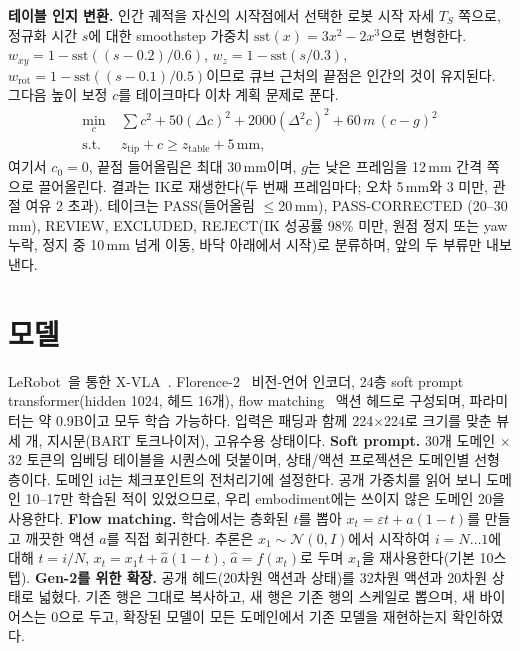 \documentclass[conference,10pt]{IEEEtran}
\newcommand{\mm}{\,mm\xspace}
\begin{document}
\textbf{테이블 인지 변환.} 인간 궤적을 자신의 시작점에서 선택한 로봇 시작 자세 $T_S$ 쪽으로, 정규화 시간 $s$에 대한 smoothstep
가중치 $\mathrm{sst}(x)=3x^2-2x^3$으로 변형한다. $w_{xy}=1-\mathrm{sst}((s-0.2)/0.6)$, $w_z=1-\mathrm{sst}(s/0.3)$,
$w_\text{rot}=1-\mathrm{sst}((s-0.1)/0.5)$이므로 큐브 근처의 끝점은 인간의 것이 유지된다. 그다음 높이 보정 $c$를 테이크마다 이차
계획 문제로 푼다.
\begin{equation}
\begin{aligned}
\min_c\;& \textstyle\sum c^2+50(\Delta c)^2+2000(\Delta^2 c)^2+60\,m\,(c-g)^2\\
\text{s.t.}\;& z_\text{tip}+c\ge z_\text{table}+5\,\text{mm},
\end{aligned}
\end{equation}
여기서 $c_0=0$, 끝점 들어올림은 최대 30\mm{}이며, $g$는 낮은 프레임을 12\mm{} 간격 쪽으로 끌어올린다. 결과는 IK로 재생한다(두 번째
프레임마다; 오차 5\mm{}와 3\textdegree{} 미만, 관절 여유 2\textdegree{} 초과). 테이크는 PASS(들어올림 $\le$20\mm), PASS-CORRECTED
(20--30\mm), REVIEW, EXCLUDED, REJECT(IK 성공률 98\% 미만, 원점 정지 또는 yaw 누락, 정지 중 10\mm{} 넘게 이동, 바닥 아래에서
시작)로 분류하며, 앞의 두 부류만 내보낸다.

\section{모델}\label{m:sec:model}
LeRobot~\cite{cadene2024lerobot}을 통한 X-VLA~\cite{zheng2025xvla}. Florence-2~\cite{xiao2024florence2} 비전-언어 인코더, 24층
soft prompt transformer(hidden 1024, 헤드 16개), flow matching~\cite{lipman2023flow} 액션 헤드로 구성되며, 파라미터는 약 0.9B이고
모두 학습 가능하다. 입력은 패딩과 함께 224$\times$224로 크기를 맞춘 뷰 세 개, 지시문(BART 토크나이저), 고유수용 상태이다.
\textbf{Soft prompt.} 30개 도메인 $\times$ 32 토큰의 임베딩 테이블을 시퀀스에 덧붙이며, 상태/액션 프로젝션은 도메인별 선형층이다.
도메인 id는 체크포인트의 전처리기에 설정한다. 공개 가중치를 읽어 보니 도메인 10--17만 학습된 적이 있었으므로, 우리 embodiment에는
쓰이지 않은 도메인 20을 사용한다. \textbf{Flow matching.} 학습에서는 층화된 $t$를 뽑아 $x_t=\varepsilon t+a(1-t)$를 만들고 깨끗한
액션 $a$를 직접 회귀한다. 추론은 $x_1\sim\mathcal N(0,I)$에서 시작하여 $i=N\dots1$에 대해 $t=i/N$, $x_t=x_1 t+\hat a(1-t)$,
$\hat a=f(x_t)$로 두며 $x_1$을 재사용한다(기본 10스텝). \textbf{Gen-2를 위한 확장.} 공개 헤드(20차원 액션과 상태)를 32차원 액션과
20차원 상태로 넓혔다. 기존 행은 그대로 복사하고, 새 행은 기존 행의 스케일로 뽑으며, 새 바이어스는 0으로 두고, 확장된 모델이 모든
도메인에서 기존 모델을 재현하는지 확인하였다.
\end{document}
